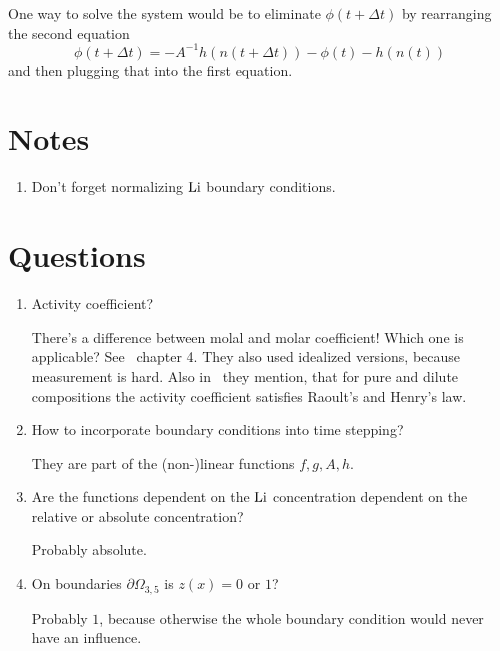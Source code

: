 \documentclass[a4paper,11pt]{scrartcl}
\newcommand*{\Li}{\ce{Li}}
\newcommand*{\Dt}{\Delta t}
\begin{document}
One way to solve the system would be to eliminate $\phi(t+\Dt)$ by
rearranging the second equation
  \[\phi(t+\Dt) = - A^{-1} h(n(t+\Dt)) - \phi(t) - h(n(t))\]
and then plugging that into the first equation.

\section*{Notes}
\begin{enumerate}
\item Don't forget normalizing $\Li$ boundary conditions.
\end{enumerate}
\section*{Questions}
\begin{enumerate}
\item Activity coefficient?

  There's a difference between molal and molar coefficient! Which one is applicable?
  See~\cite{doyle95} chapter 4.
  They also used idealized versions, because measurement is hard.
  Also in~\cite{garcia2005} they mention, that for pure and dilute compositions
  the activity coefficient satisfies Raoult's and Henry's law.

\item How to incorporate boundary conditions into time stepping?

  They are part of the (non-)linear functions $f, g, A, h$.

\item Are the functions dependent on the $\Li$ concentration dependent on the
  relative or absolute concentration?

  Probably absolute.

\item On boundaries $\partial\Omega_{3,5}$ is $z(x) = 0$ or $1$?

  Probably $1$, because otherwise the whole boundary condition would never
  have an influence.
\end{enumerate}

{}

\end{document}
